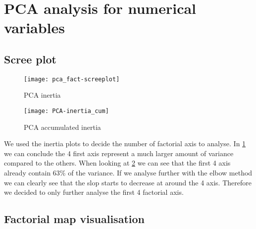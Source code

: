 

\section{PCA analysis for numerical variables}%
\label{sec:pca_analysis_for_numerical_variables}

\subsection{Scree plot}%
\label{sub:scree_plot}


\begin{figure}[H]
    \centering
    \texttt{[image: pca\_fact-screeplot]} %
    \caption{PCA inertia}%
    \label{fig:pca_inertia}
\end{figure}

\begin{figure}[H]
    \centering
    \texttt{[image: PCA-inertia\_cum]}
    \caption{PCA accumulated inertia}%
    \label{fig:pca_inertia_cum}
\end{figure}

\vspace{-1em}
We used the inertia plots to decide the number of factorial axis to analyse. In
\cref{fig:pca_inertia} we can conclude the 4 first axis represent a much
larger amount of variance compared to the others. When looking at
\cref{fig:pca_inertia_cum} we can see that the first 4 axis already contain 63\%
of the variance. If we analyse further with the elbow method we can clearly see
that the slop starts to decrease at around the 4 axis. Therefore we decided to
only further analyse the first 4 factorial axis.



\subsection{Factorial map visualisation}%
\label{sub:factorial_map_visualisation}

\newcommand{\factorialmap}[2]{
    \begin{landscape}
    \begin{figure}[H]
        \centering
        \texttt{[image: pca\_fact-plane\_\#1\_\#2-bi]}
        \caption{PCA plane #1 vs #2}%
        \label{fig:plane_#1-#2}
    \end{figure}
    \end{landscape}
}

